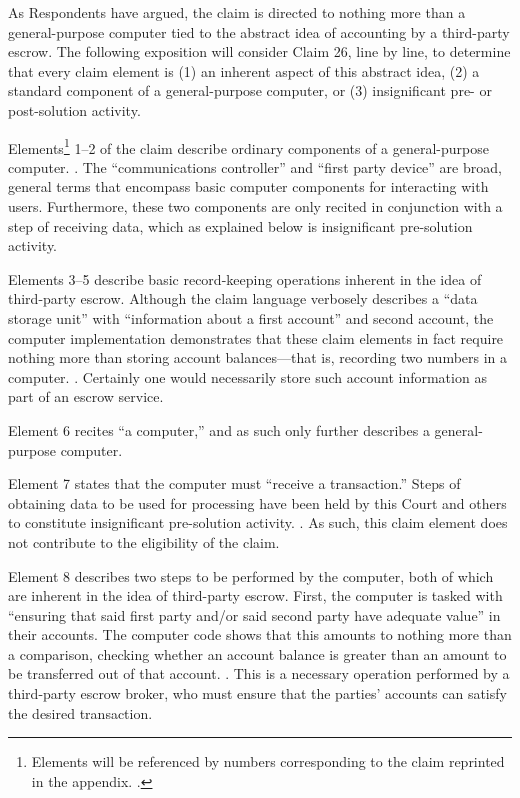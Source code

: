 \documentclass{scotus}
\begin{document}
As Respondents have argued, the claim is directed to nothing more than a
general-purpose computer tied to the abstract idea of accounting by a
third-party escrow. The following exposition will consider Claim 26, line by
line, to determine that every claim element is (1) an inherent aspect of this
abstract idea, (2) a standard component of a general-purpose computer, or
(3) insignificant pre- or post-solution activity.


Elements\footnote{Elements will be referenced by numbers corresponding to
the claim reprinted in the appendix. .} 1--2 of
the
claim describe ordinary components of a general-purpose computer. . The ``communications controller'' and
``first party device'' are broad, general terms that encompass basic computer
components for interacting with users. Furthermore, these two components are
only recited in conjunction with a step of receiving data, which as explained
below is insignificant pre-solution activity.

Elements 3--5 describe basic record-keeping operations inherent in the idea of
third-party escrow. Although the claim language verbosely describes a ``data
storage unit'' with ``information about a first account'' and second account,
the computer implementation demonstrates that these claim elements in fact
require nothing more than storing account balances---that is, recording two
numbers in a computer. .
Certainly one would necessarily store such account information as part of an
escrow service.

Element 6 recites ``a computer,'' and as such only further describes a
general-purpose computer.

Element 7 states that the computer must ``receive a transaction.'' Steps of
obtaining data to be used for processing have been held by this Court and others
to constitute insignificant pre-solution activity. . As such,
this
claim element does not contribute to the eligibility of the claim.

Element 8 describes two steps to be performed by the computer, both of which are
inherent in the idea of third-party escrow. First, the computer is tasked with
``ensuring that said first party and/or said second party have adequate value''
in their accounts. The computer code shows that this amounts to nothing more
than a comparison, checking whether an account balance is greater than an amount
to be transferred out of that account. . This is a necessary operation performed by a third-party escrow broker, who
must ensure that the parties' accounts can satisfy the desired transaction.
\end{document}
